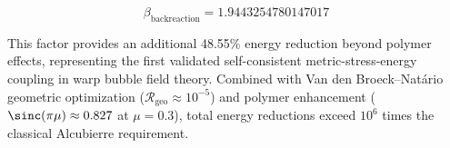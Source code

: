 \documentclass[11pt]{article}
\begin{document}
\begin{equation}
\boxed{\beta_{\text{backreaction}} = 1.9443254780147017}
\end{equation}

This factor provides an additional 48.55\% energy reduction beyond polymer effects, representing the first validated self-consistent metric-stress-energy coupling in warp bubble field theory. Combined with Van den Broeck–Natário geometric optimization ($\mathcal{R}_{\text{geo}} \approx 10^{-5}$) and polymer enhancement ($\sinc(\pi\mu) \approx 0.827$ at $\mu = 0.3$), total energy reductions exceed $10^6$ times the classical Alcubierre requirement.
\end{document}
